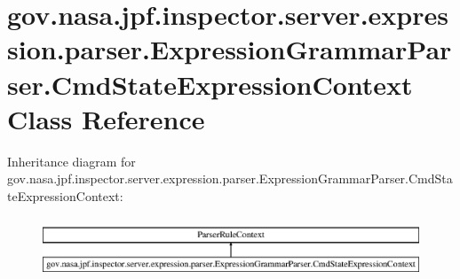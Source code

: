 \hypertarget{classgov_1_1nasa_1_1jpf_1_1inspector_1_1server_1_1expression_1_1parser_1_1_expression_grammar_pa37db371aaa956234112b7f14e4ab3f14}{}\section{gov.\+nasa.\+jpf.\+inspector.\+server.\+expression.\+parser.\+Expression\+Grammar\+Parser.\+Cmd\+State\+Expression\+Context Class Reference}
\label{classgov_1_1nasa_1_1jpf_1_1inspector_1_1server_1_1expression_1_1parser_1_1_expression_grammar_pa37db371aaa956234112b7f14e4ab3f14}
Inheritance diagram for gov.\+nasa.\+jpf.\+inspector.\+server.\+expression.\+parser.\+Expression\+Grammar\+Parser.\+Cmd\+State\+Expression\+Context\+:\begin{figure}[H]
\begin{center}
\leavevmode
\includegraphics[height=1.839080cm]{classgov_1_1nasa_1_1jpf_1_1inspector_1_1server_1_1expression_1_1parser_1_1_expression_grammar_pa37db371aaa956234112b7f14e4ab3f14}
\end{center}
\end{figure}
